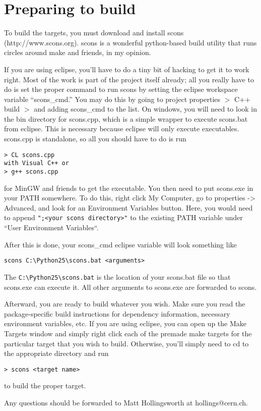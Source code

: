 \documentclass[a4paper,10pt]{article}
\begin{document}
\section{Preparing to build}

To build the targets, you must download and install scons (http://www.scons.org).  scons is a wonderful python-based build utility that runs circles around make and friends, in my opinion.

If you are using eclipse, you'll have to do a tiny bit of hacking to get it to work right.  Most of the work is part
of the project itself already; all you really have to do is set the proper command to run scons by setting the eclipse
workspace variable ``scons\_cmd.''  You may do this by going to project properties $>$ C++ build $>$ and adding scons\_cmd to the list.  On windows, you will need to look in the bin directory for scons.cpp, which is a simple wrapper to execute scons.bat from eclipse.  This is necessary because eclipse will only execute executables.  scons.cpp is standalone, so all you should have to do is run

\begin{verbatim}
> CL scons.cpp
with Visual C++ or
> g++ scons.cpp
\end{verbatim}


\noindent for MinGW and friends to get the executable.  You then need to put scons.exe in your PATH somewhere.  To do this, right click My Computer, go to properties -> Advanced, and look for an Environment Variables button.  Here, you would need to append \verb|";<your scons directory>"| to the existing PATH variable under ``User Environment Variables``.

After this is done, your scons\_cmd eclipse variable will look something like

\begin{verbatim}scons C:\Python25\scons.bat <arguments>\end{verbatim}

The \verb|C:\Python25\scons.bat| is the location of your scons.bat file so that scons.exe can execute it.  All other arguments to scons.exe are forwarded to scons.

Afterward, you are ready to build whatever you wish.  Make sure you read the package-specific build instructions for dependency information, necessary environment variables, etc. If you are using eclipse, you can open up the Make Targets window and simply right click each of the premade make targets for the particular target that you wish to build.  Otherwise, you'll simply need to cd to the appropriate directory and run

\begin{verbatim}> scons <target name>\end{verbatim}

\noindent to build the proper target.


Any questions should be forwarded to Matt Hollingsworth at hollings@cern.ch.
\end{document}
